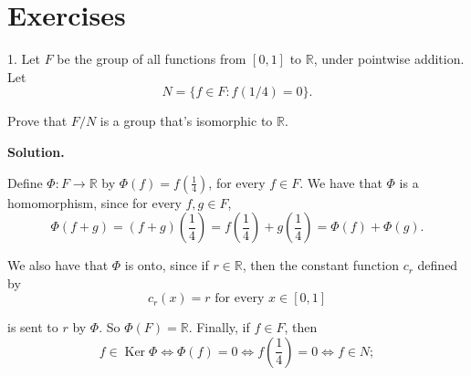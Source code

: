 \documentclass[10pt,]{book}
\theoremstyle{plain}
\theoremstyle{definition}
\theoremstyle{definition}
\theoremstyle{definition}
\theoremstyle{definition}
\numberwithin{equation}{section}
\def\R{\mathbb{R}}
\DeclareMathOperator{\Ker}{Ker}
\begin{document}
\section[{Exercises}]{Exercises}\label{exercises-10}
\begin{exerciselist}
\item[1.]\hypertarget{exercise-63}{}
        Let \(F\) be the group of all functions from \([0,1]\) to
        \(\R\), under pointwise addition. Let
\begin{equation*}

          N=\{f\in F:
          f(1/4)=0\}.
        
\end{equation*}

\par

        Prove that \(F/N\) is a group that's
        isomorphic to \(\R\).
\par\smallskip
\par\smallskip
\noindent\textbf{Solution.}\hypertarget{solution-63}{}\quad

      Define \(\Phi:F\rightarrow \R\) by
      \(\Phi(f)=f\left(\frac{1}{4}\right)\), for every \(f\in F\). We have
      that \(\Phi\) is a homomorphism, since for every \(f, g\in F\),
\begin{equation*}

        \Phi(f+g)=(f+g)\left(\frac{1}{4}\right)=f\left(\frac{1}{4}\right)+g\left(\frac{1}{4}\right)=\Phi(f)+\Phi(g).
      
\end{equation*}

\par

      We also have that \(\Phi\) is onto, since if \(r\in \R\), then the
      constant function \(c_r\) defined by
\begin{equation*}

        c_r(x)=r \mbox{ for every \(x\in
        [0,1]\)}
      
\end{equation*}

      is sent to \(r\) by \(\Phi\). So \(\Phi(F)=\R\). Finally, if
      \(f\in F\), then
\begin{equation*}

        f\in \Ker \Phi \Leftrightarrow \Phi(f)=0 \Leftrightarrow
        f\left(\frac{1}{4}\right)=0 \Leftrightarrow f\in N;
      
\end{equation*}


\end{exerciselist}
\end{document}
